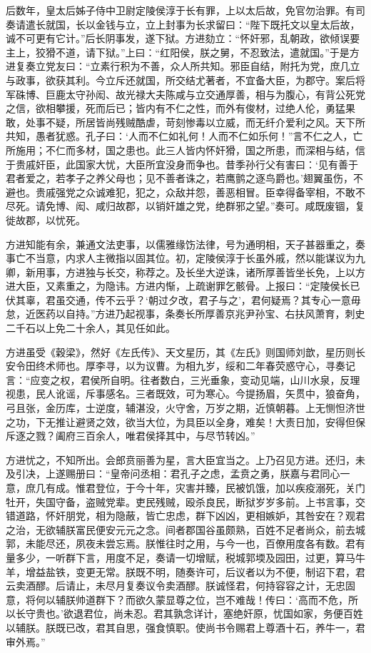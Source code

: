 \documentclass[12pt,UTF8]{ctexbook}
\begin{document}
后数年，皇太后姊子侍中卫尉定陵侯淳于长有罪，上以太后故，免官勿治罪。有司奏请遣长就国，长以金钱与立，立上封事为长求留曰：“陛下既托文以皇太后故，诚不可更有它计。”后长阴事发，遂下狱。方进劾立：“怀奸邪，乱朝政，欲倾误要主上，狡猾不道，请下狱。”上曰：“红阳侯，朕之舅，不忍致法，遣就国。”于是方进复奏立党友曰：“立素行积为不善，众人所共知。邪臣自结，附托为党，庶几立与政事，欲获其利。今立斥还就国，所交结尤著者，不宜备大臣，为郡守。案后将军硃博、巨鹿太守孙闳、故光禄大夫陈咸与立交通厚善，相与为腹心，有背公死党之信，欲相攀援，死而后已；皆内有不仁之性，而外有俊材，过绝人伦，勇猛果敢，处事不疑，所居皆尚残贼酷虐，苛刻惨毒以立威，而无纤介爱利之风。天下所共知，愚者犹惑。孔子曰：‘人而不仁如礼何！人而不仁如乐何！”言不仁之人，亡所施用；不仁而多材，国之患也。此三人皆内怀奸猾，国之所患，而深相与结，信于贵戚奸臣，此国家大忧，大臣所宜没身而争也。昔季孙行父有害曰：‘见有善于君者爱之，若孝子之养父母也；见不善者诛之，若鹰鹯之逐鸟爵也。’翅翼虽伤，不避也。贵戚强党之众诚难犯，犯之，众敌并怨，善恶相冒。臣幸得备宰相，不敢不尽死。请免博、闳、咸归故郡，以销奸雄之党，绝群邪之望。”奏可。咸既废锢，复徙故郡，以忧死。



方进知能有余，兼通文法吏事，以儒雅缘饬法律，号为通明相，天子甚器重之，奏事亡不当意，内求人主微指以固其位。初，定陵侯淳于长虽外戚，然以能谋议为九卿，新用事，方进独与长交，称荐之。及长坐大逆诛，诸所厚善皆坐长免，上以方进大臣，又素重之，为隐讳。方进内惭，上疏谢罪乞骸骨。上报曰：“定陵侯长已伏其辜，君虽交通，传不云乎？‘朝过夕改，君子与之’，君何疑焉？其专心一意毋怠，近医药以自持。”方进乃起视事，条奏长所厚善京兆尹孙宝、右扶风萧育，刺史二千石以上免二十余人，其见任如此。



方进虽受《穀梁》，然好《左氏传》、天文星历，其《左氏》则国师刘歆，星历则长安令田终术师也。厚李寻，以为议曹。为相九岁，绥和二年春荧惑守心，寻奏记言：“应变之权，君侯所自明。往者数白，三光垂象，变动见端，山川水泉，反理视患，民人讹谣，斥事感名。三者既效，可为寒心。今提扬眉，矢贯中，狼奋角，弓且张，金历库，士逆度，辅湛没，火守舍，万岁之期，近慎朝暮。上无恻怛济世之功，下无推让避贤之效，欲当大位，为具臣以全身，难矣！大责日加，安得但保斥逐之戮？阖府三百余人，唯君侯择其中，与尽节转凶。”



方进忧之，不知所出。会郎贲丽善为星，言大臣宜当之。上乃召见方进。还归，未及引决，上遂赐册曰：“皇帝问丞相：君孔子之虑，孟贲之勇，朕嘉与君同心一意，庶几有成。惟君登位，于今十年，灾害并臻，民被饥饿，加以疾疫溺死，关门牡开，失国守备，盗贼党辈。吏民残贼，殴杀良民，断狱岁岁多前。上书言事，交错道路，怀奸朋党，相为隐蔽，皆亡忠虑，群下凶凶，更相嫉妒，其咎安在？观君之治，无欲辅朕富民便安元元之念。间者郡国谷虽颇熟，百姓不足者尚众，前去城郭，未能尽还，夙夜未尝忘焉。朕惟往时之用，与今一也，百僚用度各有数。君有量多少，一听群下言，用度不足，奏请一切增赋，税城郭堧及园田，过更，算马牛羊，增益盐铁，变更无常。朕既不明，随奏许可，后议者以为不便，制诏下君，君云卖酒醪。后请止，未尽月复奏议令卖酒醪。朕诚怪君，何持容容之计，无忠固意，将何以辅朕帅道群下？而欲久蒙显尊之位，岂不难哉！传曰：‘高而不危，所以长守贵也。’欲退君位，尚未忍。君其孰念详计，塞绝奸原，忧国如家，务便百姓以辅朕。朕既已改，君其自思，强食慎职。使尚书令赐君上尊酒十石，养牛一，君审外焉。”
\end{document}
